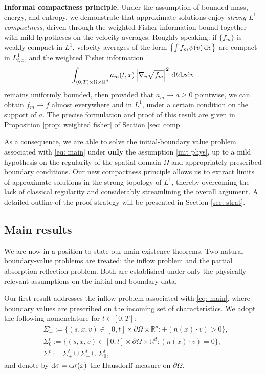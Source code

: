 \documentclass[10pt, reqno]{amsart}
\theoremstyle{plain}
\theoremstyle{definition}
\theoremstyle{remark}
\numberwithin{equation}{section}
\newcommand{\p}{\partial}
\newcommand{\R}{\mathbb{R}}
\newcommand{\dx}{\textnormal{d}x}
\newcommand{\dv}{\textnormal{d}v}
\newcommand{\dt}{\textnormal{d}t}
\newcommand{\tnd}{\textnormal{d}}
\newcommand{\lt}{\left}
\newcommand{\rt}{\right}
\begin{document}
\noindent \textbf{Informal compactness principle.}
Under the assumption of bounded mass, energy, and entropy, we demonstrate that approximate solutions enjoy
\emph{strong $L^1$ compactness}, driven through the weighted Fisher information bound
together with mild hypotheses on the velocity-averages. Roughly speaking: if $\{f_m\}$ is weakly compact in $L^1$, velocity averages of the form $\lt\{\int f_m \psi(v)\,\dv\rt\}$ are compact in $L^1_{t,x}$, and the weighted Fisher information
\[            
 \int_{(0,T)\times\Omega\times\R^d} a_m(t,x) \lt|\nabla_v \sqrt{f_m} \rt|^2 \,\dt\dx\dv  
\]
remains uniformly bounded, then provided that $a_m\to a \ge 0$ pointwise, we can obtain $f_m \to f$ almost everywhere and in $L^1$, under a certain condition on the support of $a$. The precise formulation and proof of this result are given in Proposition \ref{prop: weighted fisher} of Section \ref{sec: comp}.

As a consequence, we are able to solve the initial-boundary value problem associated with \eqref{eq: main} under \textbf{only} the assumption \eqref{init phys}, up to a mild hypothesis on the regularity of the spatial domain $\Omega$ and appropriately prescribed boundary conditions. Our new compactness principle allows us to extract limits of approximate solutions in the strong topology of $L^1$, thereby overcoming the lack of classical regularity and considerably streamlining the overall argument. A detailed outline of the proof strategy will be presented in Section \ref{sec: strat}.


%
%
%
%
%
%
\subsection{Main results}
We are now in a position to state our main existence theorems. Two natural boundary-value problems are treated: the inflow problem and the partial absorption-reflection problem. Both are established under only the physically relevant assumptions on the initial and boundary data.  

Our first result addresses the inflow problem associated with \eqref{eq: main}, where boundary values are prescribed on the incoming set of characteristics.  We adopt the following nomenclature for $t\in [0,T]$: 
\begin{align*}
    &\Sigma_\pm^t := \{(s,x,v)\in [0,t]\times \p\Omega\times\R^d : \pm (n(x)\cdot v) > 0 \}, \\
    &\Sigma_0^t := \{(s,x,v) \in [0,t]\times \p\Omega \times \R^d : (n(x)\cdot v) = 0 \}, \\
    &\Sigma^t := \Sigma_+^t \cup \Sigma_-^t \cup \Sigma_0^t,
\end{align*}
and denote by $\tnd\sigma = \tnd\sigma(x)$ the Hausdorff measure on $\p\Omega$.
\end{document}
